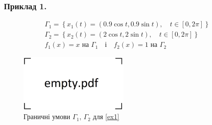 \documentclass{beamer}
\numberwithin{equation}{section}
\begin{document}
	\begin{frame}
		\frametitle{Приклад 1.}
				
					
		
		{\small{
		\begin{equation}
			\label{ex1}
			\begin{array}{l}
				\displaystyle
				\Gamma_{1}=\left\{x_{1}(t)=(0.9 \cos t, 0.9 \sin t), \quad t \in[0,2 
				\pi]\right\} \\
				
				\displaystyle
				\Gamma_{2}=\left\{x_{2}(t)=(2 \cos t, 2 \sin t), \quad  t \in[0,2 \pi]\right\} \\[0.1cm]

				\displaystyle
				f_{1}(x)=x  \text { на } \Gamma_{1} \quad \text {і} \quad
				f_{2}(x)=1  \text { на } \Gamma_{2}
			\end{array}
		\end{equation}
		}}
				
		\begin{figure}
			\includegraphics[width=0.48\textwidth]{../images/empty.pdf}
			\caption{Граничні умови $\Gamma_1$, $\Gamma_2$ для \ref{ex1}}
		\end{figure}
		
	\end{frame}

	
\end{document}
